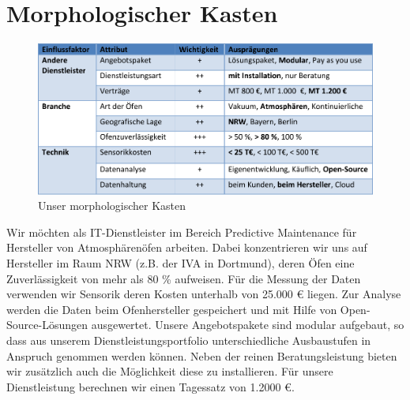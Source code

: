 \section{Morphologischer Kasten}

\begin{figure}[H]
\centering
\includegraphics[width=0.9\linewidth]{Bilder/MorphologischerKasten}
\caption{Unser morphologischer Kasten}
\label{fig:MorphologischerKasten}
\end{figure}

Wir möchten als IT-Dienstleister im Bereich Predictive Maintenance für Hersteller von Atmosphärenöfen arbeiten. Dabei konzentrieren wir uns auf Hersteller im Raum NRW (z.B. der IVA in Dortmund), deren Öfen eine Zuverlässigkeit von mehr als 80 \% aufweisen. Für die Messung der Daten verwenden wir Sensorik deren Kosten unterhalb von 25.000 € liegen. Zur Analyse werden die Daten beim Ofenhersteller gespeichert und mit Hilfe von Open-Source-Lösungen ausgewertet. Unsere Angebotspakete sind modular aufgebaut, so dass aus unserem Dienstleistungsportfolio unterschiedliche Ausbaustufen in Anspruch genommen werden können. Neben der reinen Beratungsleistung bieten wir zusätzlich auch die Möglichkeit diese zu installieren. Für unsere Dienstleistung berechnen wir einen Tagessatz von 1.2000 €.
